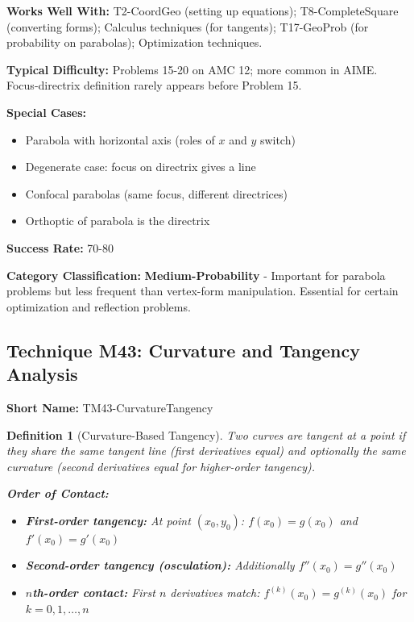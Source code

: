 \documentclass[12pt]{article}
\newtheorem{definition}{Definition}[section]
\begin{document}
\textbf{Works Well With:} T2-CoordGeo (setting up equations); T8-CompleteSquare (converting forms); Calculus techniques (for tangents); T17-GeoProb (for probability on parabolas); Optimization techniques.

\textbf{Typical Difficulty:} Problems 15-20 on AMC 12; more common in AIME. Focus-directrix definition rarely appears before Problem 15.

\textbf{Special Cases:} 
\begin{itemize}
    \item Parabola with horizontal axis (roles of $x$ and $y$ switch)
    \item Degenerate case: focus on directrix gives a line
    \item Confocal parabolas (same focus, different directrices)
    \item Orthoptic of parabola is the directrix
\end{itemize}

\textbf{Success Rate:} 70-80%

\textbf{Category Classification:} \textbf{Medium-Probability} - Important for parabola problems but less frequent than vertex-form manipulation. Essential for certain optimization and reflection problems.

\subsection{Technique M43: Curvature and Tangency Analysis}
\textbf{Short Name:} TM43-CurvatureTangency

\begin{definition}[Curvature-Based Tangency]
Two curves are tangent at a point if they share the same tangent line (first derivatives equal) and optionally the same curvature (second derivatives equal for higher-order tangency).

\textbf{Order of Contact:}
\begin{itemize}
    \item \textbf{First-order tangency:} At point $(x_0, y_0)$: $f(x_0) = g(x_0)$ and $f'(x_0) = g'(x_0)$
    \item \textbf{Second-order tangency (osculation):} Additionally $f''(x_0) = g''(x_0)$
    \item \textbf{$n$th-order contact:} First $n$ derivatives match: $f^{(k)}(x_0) = g^{(k)}(x_0)$ for $k = 0, 1, \ldots, n$
\end{itemize}
\end{definition}
\end{document}
